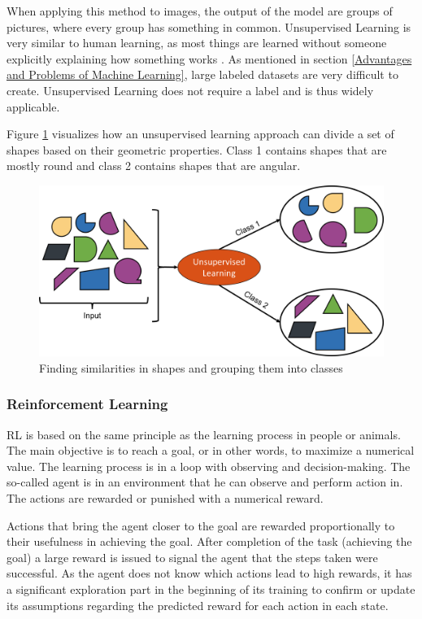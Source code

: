 When applying this method to images, the output of the model are groups of pictures, where every group has something in common. Unsupervised Learning is very similar to human learning, as most things are learned without someone explicitly explaining how something works \cite{Murphy}. As mentioned in section \ref{Advantages and Problems of Machine Learning}, large labeled datasets are very difficult to create. Unsupervised Learning does not require a label and is thus widely applicable.

Figure \ref{fig:USL} visualizes how an unsupervised learning approach can divide a set of shapes based on their geometric properties. Class 1 contains shapes that are mostly round and class 2 contains shapes that are angular. 

\begin{figure}[H]
	\centering
	\includegraphics[width=0.9\linewidth]{IMGs/USL.png}
 	\caption{Finding similarities in shapes and grouping them into classes}
 	\label{fig:USL}
\end{figure}


\subsubsection*{Reinforcement Learning}

RL is based on the same principle as the learning process in people or animals. The main objective is to reach a goal, or in other words, to maximize a numerical value. The learning process is in a loop with observing and decision-making. The so-called agent is in an environment that he can observe and perform action in. The actions are rewarded or punished with a numerical reward. \cite{LEX}
 
Actions that bring the agent closer to the goal are rewarded proportionally to their usefulness in achieving the goal. After completion of the task (achieving the goal) a large reward is issued to signal the agent that the steps taken were successful. As the agent does not know which actions lead to high rewards, it has a significant exploration part in the beginning of its training to confirm or update its assumptions regarding the predicted reward for each action in each state.~\cite{Sutton}

